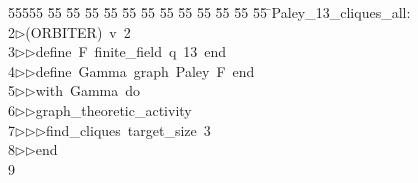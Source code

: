 %
%
\begin{tabbing}
55555 \= 55 \= 55 \= 55 \= 55 \= 55 \= 55 \= 55 \= 55 \= 55 \= 55 \= 55 \= 55 \= \>Paley\_13\_cliques\_all:\\[0pt]
2\>$\triangleright$\>(ORBITER)\ v\ 2\ \\[0pt]
3\>$\triangleright$\>$\triangleright$\>define\ F\ finite\_field\ q\ 13\ end\ \\[0pt]
4\>$\triangleright$\>$\triangleright$\>define\ Gamma\ graph\ Paley\ F\ end\ \\[0pt]
5\>$\triangleright$\>$\triangleright$\>with\ Gamma\ do\ \\[0pt]
6\>$\triangleright$\>$\triangleright$\>graph\_theoretic\_activity\ \\[0pt]
7\>$\triangleright$\>$\triangleright$\>$\triangleright$\>find\_cliques\ target\_size\ 3\ \\[0pt]
8\>$\triangleright$\>$\triangleright$\>end\\[0pt]
9\>\end{tabbing}
